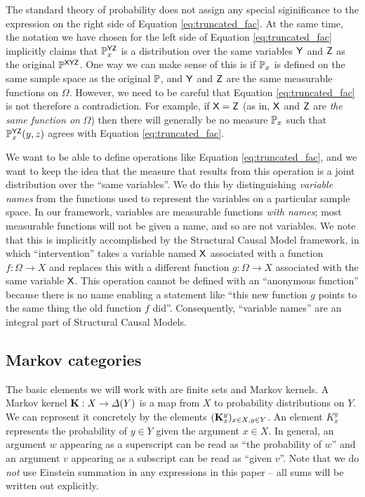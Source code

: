 The standard theory of probability does not assign any special siginificance to the expression on the right side of Equation \ref{eq:truncated_fac}. At the same time, the notation we have chosen for the left side of Equation \ref{eq:truncated_fac} implicitly claims that $\mathbb{P}^{\mathsf{YZ}}_{x}$ is a distribution over the same variables $\mathsf{Y}$ and $\mathsf{Z}$ as the original $\mathbb{P}^{\mathsf{XYZ}}$. One way we can make sense of this is if $\mathbb{P}_{x}$ is defined on the same sample space as the original $\mathbb{P}$, and $\mathsf{Y}$ and $\mathsf{Z}$ are the same measurable functions on $\Omega$. However, we need to be careful that Equation \ref{eq:truncated_fac} is not therefore a contradiction. For example, if $\mathsf{X}=\mathsf{Z}$ (as in, $\mathsf{X}$ and $\mathsf{Z}$ are \emph{the same function on }$\Omega$) then there will generally be no measure $\mathbb{P}_x$ such that $\mathbb{P}^{\mathsf{YZ}}_{x}(y,z)$ agrees with Equation \ref{eq:truncated_fac}.

We want to be able to define operations like Equation \ref{eq:truncated_fac}, and we want to keep the idea that the measure that results from this operation is a joint distribution over the ``same variables''. We do this by distinguishing \emph{variable names} from the functions used to represent the variables on a particular sample space. In our framework, variables are measurable functions \emph{with names}; most measurable functions will not be given a name, and so are not variables. We note that this is implicitly accomplished by the Structural Causal Model framework, in which ``intervention'' takes a variable named $\mathsf{X}$ associated with a function $f:\Omega\to X$ and replaces this with a different function $g:\Omega \to X$ associated with the same variable $\mathsf{X}$. This operation cannot be defined with an ``anonymous function'' because there is no name enabling a statement like ``this new function $g$ points to the same thing the old function $f$ did''. Consequently, ``variable names'' are an integral part of Structural Causal Models.

\subsection{Markov categories}
The basic elements we will work with are finite sets and Markov kernels. A Markov kernel $\mathbf{K}:X\to \Delta(Y)$ is a map from $X$ to probability distributions on $Y$. We can represent it concretely by the elements $(\mathbf{K}_{x}^y)_{x\in X, y\in Y}$. An element $K_x^y$ represents the probability of $y\in Y$ given the argument $x\in X$. In general, an argument $w$ appearing as a superscript can be read as ``the probability of $w$'' and an argument $v$ appearing as a subscript can be read as ``given $v$''. Note that we do \emph{not} use Einstein summation in any expressions in this paper -- all sums will be written out explicitly.

